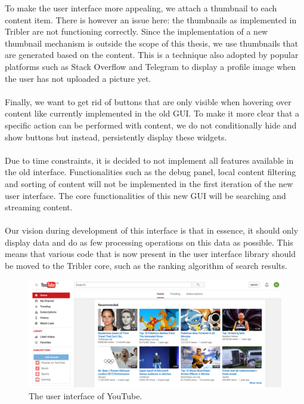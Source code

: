 \noindent To make the user interface more appealing, we attach a thumbnail to each content item. There is however an issue here: the thumbnails as implemented in Tribler are not functioning correctly. Since the implementation of a new thumbnail mechanism is outside the scope of this thesis, we use thumbnails that are generated based on the content. This is a technique also adopted by popular platforms such as Stack Overflow and Telegram to display a profile image when the user has not uploaded a picture yet.\\\\
Finally, we want to get rid of buttons that are only visible when hovering over content like currently implemented in the old GUI. To make it more clear that a specific action can be performed with content, we do not conditionally hide and show buttons but instead, persistently display these widgets.\\\\
Due to time constraints, it is decided to not implement all features available in the old interface. Functionalities such as the debug panel, local content filtering and sorting of content will not be implemented in the first iteration of the new user interface. The core functionalities of this new GUI will be searching and streaming content.\\\\
Our vision during development of this interface is that in essence, it should only display data and do as few processing operations on this data as possible. This means that various code that is now present in the user interface library should be moved to the Tribler core, such as the ranking algorithm of search results.

\begin{figure}[t]
	\centering
	\includegraphics[width=1.0\columnwidth]{images/implementation/youtube_interface}
	\caption{The user interface of YouTube.}
	\label{fig:youtube-interface}
\end{figure}

